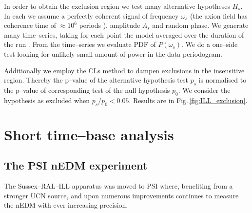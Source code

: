 {  In order to obtain the exclusion region we test many alternative hypotheses $H_s$. In each we assume a perfectly coherent signal of frequency $\omega_s$ (the axion field has coherence time of $\approx 10^6$ periods ), amplitude $A_s$ and random phase. We generate many time--series, taking for each point the model averaged over the duration of the run . From the time--series we evaluate PDF of $P(\omega_s)$. We do a one--side test looking for unlikely small amount of power in the data periodogram.

  Additionally we employ the CLs method  to dampen exclusions in the insensitive region. Thereby the p--value of the alternative hypothesis test $p_s$ is normalised to the p--value of corresponding test of the null hypothesis $p_0$. We consider the hypothesis as excluded when $p_s / p_0 < 0.05$. Results are in Fig.\,\ref{fig:ILL_exclusion}.

}


\section{Short time--base analysis}
\subsection{The PSI nEDM experiment}
The Sussex--RAL--ILL apparatus was moved to PSI where, benefiting from a stronger UCN source, and upon numerous improvements continues to measure the nEDM with ever increasing precision.

